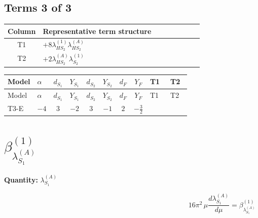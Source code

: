 \documentclass[8pt]{article}
\begin{document}
\begin{landscape}
\subsection*{Terms 3 of 3}
\begin{center}
\begin{tabular}{@{}c >{\raggedright\arraybackslash}p{0.82\linewidth}@{}}
\toprule
Column & Representative term structure \\
\midrule
T1 & \(\displaystyle +8 {\lambda_{HS_2}^{(1)}} {\lambda_{HS_2}^{(A)}}\) \\
\midrule
T2 & \(\displaystyle +2 {\lambda_{HS_2}^{(A)}} {\lambda_{S_2}^{(1)}}\) \\
\midrule
\bottomrule
\end{tabular}
\end{center}
\smallskip
\tiny
\begin{longtable}{@{}llcccccc >{\raggedright\arraybackslash}p{0.21\linewidth} >{\raggedright\arraybackslash}p{0.21\linewidth}@{}}
\toprule
Model & $\alpha$ & $d_{S_1}$ & $Y_{S_1}$ & $d_{S_2}$ & $Y_{S_2}$ & $d_F$ & $Y_F$ & T1 & T2 \\
\midrule
\endfirsthead
\toprule
Model & $\alpha$ & $d_{S_1}$ & $Y_{S_1}$ & $d_{S_2}$ & $Y_{S_2}$ & $d_F$ & $Y_F$ & T1 & T2 \\
\midrule
\endhead
T3-E & $-4$ & $3$ & $-2$ & $3$ & $-1$ & $2$ & $-\frac{3}{2}$ & \scriptsize\adjustbox{max width=\linewidth}{$\begin{gathered} +8 {\lambda_{HS_2}^{(1)}} {\lambda_{HS_2}^{(A)}}\end{gathered}$} & \scriptsize\adjustbox{max width=\linewidth}{$\begin{gathered} +2 {\lambda_{HS_2}^{(A)}} {\lambda_{S_2}^{(1)}}\end{gathered}$} \\
\midrule
\bottomrule
\end{longtable}
\clearpage
\section*{$\beta_{\lambda_{S_1}^{(A)}}^{(1)}$}
\noindent\textbf{Quantity: }$\lambda_{S_1}^{(A)}$\par\smallskip
\[16\pi^2\,\mu\frac{d \lambda_{S_1}^{(A)}}{d\mu}=\beta_{\lambda_{S_1}^{(A)}}^{(1)}\]

\end{landscape}
\end{document}
